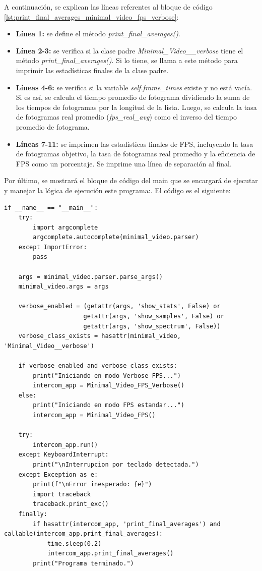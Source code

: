 A continuación, se explican las líneas referentes al bloque de código \ref{lst:print_final_averages_minimal_video_fps_verbose}:
\begin{itemize}
    \item \textbf{Línea 1:} se define el método \textit{print\_final\_averages()}.
    \item \textbf{Línea 2-3:} se verifica si la clase padre \textit{Minimal\_Video\_\_verbose} tiene el método \textit{print\_final\_averages()}. Si lo tiene, se llama a este método para imprimir las estadísticas finales de la clase padre.
    \item \textbf{Líneas 4-6:} se verifica si la variable \textit{self.frame\_times} existe y no está vacía. Si es así, se calcula el tiempo promedio de fotograma dividiendo la suma de los tiempos de fotogramas por la longitud de la lista. Luego, se calcula la tasa de fotogramas real promedio (\textit{fps\_real\_avg}) como el inverso del tiempo promedio de fotograma.
    \item \textbf{Líneas 7-11:} se imprimen las estadísticas finales de FPS, incluyendo la tasa de fotogramas objetivo, la tasa de fotogramas real promedio y la eficiencia de FPS como un porcentaje. Se imprime una línea de separación al final.
\end{itemize}
\vspace{\baselineskip}

Por último, se mostrará el bloque de código del main que se encargará de ejecutar y manejar la lógica de ejecución este programa:. El código es el siguiente:
\begin{lstlisting}[style=pythonstyle, caption={Bloque de código del main de Minimal\_Video\_FPS.py}, label={lst:main_fps}]
if __name__ == "__main__":
    try:
        import argcomplete
        argcomplete.autocomplete(minimal_video.parser)
    except ImportError:
        pass
    
    args = minimal_video.parser.parse_args()
    minimal_video.args = args
    
    verbose_enabled = (getattr(args, 'show_stats', False) or
                      getattr(args, 'show_samples', False) or
                      getattr(args, 'show_spectrum', False))
    verbose_class_exists = hasattr(minimal_video, 'Minimal_Video__verbose')
    
    if verbose_enabled and verbose_class_exists:
        print("Iniciando en modo Verbose FPS...")
        intercom_app = Minimal_Video_FPS_Verbose()
    else:
        print("Iniciando en modo FPS estandar...")
        intercom_app = Minimal_Video_FPS()

    try:
        intercom_app.run()
    except KeyboardInterrupt:
        print("\nInterrupcion por teclado detectada.")
    except Exception as e:
        print(f"\nError inesperado: {e}")
        import traceback
        traceback.print_exc()
    finally:
        if hasattr(intercom_app, 'print_final_averages') and callable(intercom_app.print_final_averages):
            time.sleep(0.2)
            intercom_app.print_final_averages()
        print("Programa terminado.")
\end{lstlisting}
\vspace{\baselineskip}

